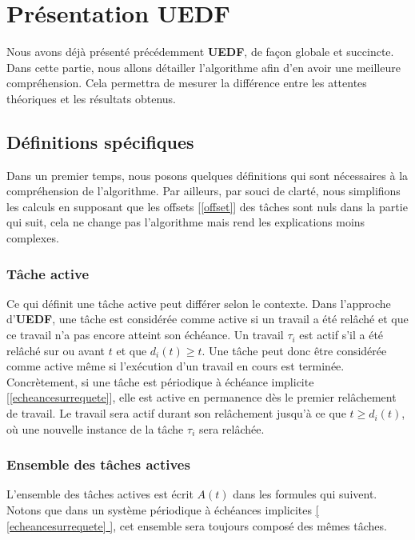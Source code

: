 	
	\section{Présentation UEDF}\label{contexte}
	
	Nous avons déjà présenté précédemment \textbf{UEDF}, de façon globale et succincte. 
	Dans cette partie, nous allons détailler l'algorithme afin d'en avoir une meilleure compréhension. Cela 
	permettra de mesurer la différence entre les attentes théoriques et les résultats obtenus.\newline
	
	
	\subsection{Définitions spécifiques}
	Dans un premier temps, nous posons quelques définitions qui sont nécessaires à la compréhension de l'algorithme. 
	Par ailleurs, par souci de clarté, nous simplifions les calculs en supposant que les offsets [\ref*{offset}] des tâches 
	sont nuls dans la partie qui suit, cela ne change pas l'algorithme mais rend les explications moins 
	complexes.
	
	\subsubsection{Tâche active}\label{tacheactive}
	Ce qui définit une tâche \og{}active\fg{} peut différer selon le contexte. Dans l'approche d'\textbf{UEDF}, une tâche est 
	considérée comme active si un travail a été relâché et que ce travail n'a pas encore atteint son échéance. 
	Un travail $\tau_i$ est actif s'il a été relâché sur ou avant $t$ et que $d_i(t) \geq t$.
	Une tâche peut donc 
	être considérée comme active même si l'exécution d'un travail en cours est terminée. 
	Concrètement, si une tâche est périodique à échéance implicite [\hyperref[echeancesurrequete]{\ref*{echeancesurrequete}}], elle est active en permanence dès le 
	premier relâchement de travail. Le travail sera actif durant son relâchement jusqu'à ce que $t \geq d_i(t)$, où 
	une nouvelle instance de la tâche $\tau_i$ sera relâchée.
	
	
	\subsubsection{Ensemble des tâches actives}\label{ensembledestachesactives}
	L'ensemble des tâches actives est écrit $A(t)$ dans les formules qui suivent. Notons que dans un système 
	périodique à échéances implicites \hyperref[echeancesurrequete]{[ \ref*{echeancesurrequete} ]}, cet ensemble 
	sera toujours composé des mêmes tâches.\newline
		

